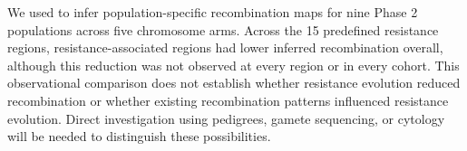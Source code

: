 We used \fastrho to infer population-specific recombination maps for nine Phase 2 populations across five chromosome arms. Across the 15 predefined resistance regions, resistance-associated regions had lower inferred recombination overall, although this reduction was not observed at every region or in every cohort. This observational comparison does not establish whether resistance evolution reduced recombination or whether existing recombination patterns influenced resistance evolution. Direct investigation using pedigrees, gamete sequencing, or cytology will be needed to distinguish these possibilities.
